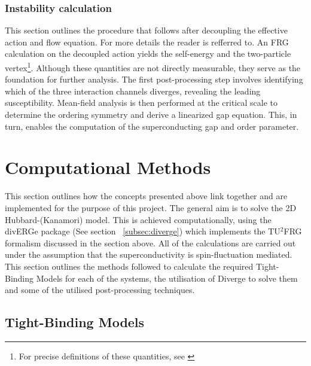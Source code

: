 \documentclass[12pt]{article}
\begin{document}
\subsubsection{Instability calculation}

This section outlines the procedure that follows after decoupling the effective action and flow equation. For more details the reader is refferred to\cite{profe2023functional}. 
An FRG calculation on the decoupled action yields the self-energy and the two-particle vertex\footnote{For precise definitions of these quantities, see \cite{metzner2012functional}}.
Although these quantities are not directly measurable, they serve as the foundation for further analysis. The first post-processing step involves
identifying which of the three interaction channels diverges, revealing the leading susceptibility. Mean-field analysis is then performed at the critical scale to determine the ordering symmetry 
and derive a linearized gap equation. This, in turn, enables the computation of 
the superconducting gap and order parameter.


\section{Computational Methods}

This section outlines how the concepts presented above link together and are implemented for the purpose of this project. 
The general aim is to solve the 2D Hubbard-(Kanamori) model. This is achieved computationally, using the divERGe package (See section ~\ref{subsec:diverge}) which implements the TU$^2$FRG
formalism discussed in the section above. All of the calculations are carried out under the assumption that the superconductivity 
is spin-fluctuation mediated. This section outlines the methods followed to calculate the required Tight-Binding Models for each of the systems, the utilisation of 
Diverge to solve them and some of the utilised post-processing techniques. 

\subsection{Tight-Binding Models}

\label{subsec:TBM1NN2}
\end{document}
